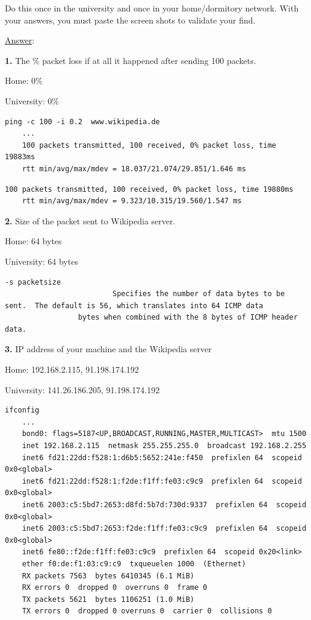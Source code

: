 \documentclass[12pt]{article}
\begin{document}
Do this once in the university and once in your home/dormitory network. With your answers, you must paste the screen shots to validate your find.

\underline{Answer}:

\lstset{breaklines=true, frame=single}

\textbf{1.} The \% packet loss if at all it happened after sending 100 packets.

Home: 0\%

University: 0\%

\begin{lstlisting}[caption=ping home]
	ping -c 100 -i 0.2  www.wikipedia.de
	...
	100 packets transmitted, 100 received, 0% packet loss, time 19883ms
	rtt min/avg/max/mdev = 18.037/21.074/29.851/1.646 ms
\end{lstlisting}

\begin{lstlisting}[caption=ping university]
	100 packets transmitted, 100 received, 0% packet loss, time 19880ms
	rtt min/avg/max/mdev = 9.323/10.315/19.560/1.547 ms
\end{lstlisting}

\textbf{2.} Size of the packet sent to Wikipedia server.

Home: 64 bytes

University: 64 bytes

\begin{lstlisting}[caption=man ping]
	       -s packetsize
	                     Specifies the number of data bytes to be sent.  The default is 56, which translates into 64 ICMP data
			     bytes when combined with the 8 bytes of ICMP header data.
\end{lstlisting}

\textbf{3.} IP address of your machine and the Wikipedia server

Home: 192.168.2.115, 91.198.174.192

University: 141.26.186.205, 91.198.174.192

\begin{lstlisting}[caption=ifconfig home]
	ifconfig
	...
	bond0: flags=5187<UP,BROADCAST,RUNNING,MASTER,MULTICAST>  mtu 1500
	inet 192.168.2.115  netmask 255.255.255.0  broadcast 192.168.2.255
	inet6 fd21:22dd:f528:1:d6b5:5652:241e:f450  prefixlen 64  scopeid 0x0<global>
	inet6 fd21:22dd:f528:1:f2de:f1ff:fe03:c9c9  prefixlen 64  scopeid 0x0<global>
	inet6 2003:c5:5bd7:2653:d8fd:5b7d:730d:9337  prefixlen 64  scopeid 0x0<global>
	inet6 2003:c5:5bd7:2653:f2de:f1ff:fe03:c9c9  prefixlen 64  scopeid 0x0<global>
	inet6 fe80::f2de:f1ff:fe03:c9c9  prefixlen 64  scopeid 0x20<link>
	ether f0:de:f1:03:c9:c9  txqueuelen 1000  (Ethernet)
	RX packets 7563  bytes 6410345 (6.1 MiB)
	RX errors 0  dropped 0  overruns 0  frame 0
	TX packets 5621  bytes 1106251 (1.0 MiB)
	TX errors 0  dropped 0 overruns 0  carrier 0  collisions 0
\end{lstlisting}
\end{document}
